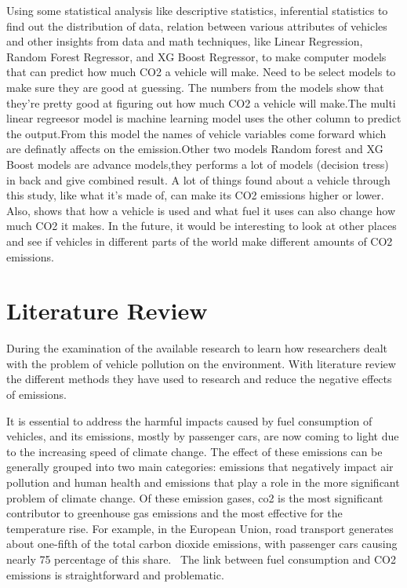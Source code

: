 \documentclass[12pt, a4paper,oneside]{book}
\numberwithin{equation}{section}
\begin{document}
Using some statistical analysis like descriptive statistics, inferential statistics to find out the distribution of data, relation between various attributes of vehicles and other insights from data and math techniques, like Linear Regression, Random Forest Regressor, and XG Boost Regressor, to make computer models that can predict how much CO2 a vehicle will make. Need to be select models to make sure they are good at guessing. The numbers from the models show that they're pretty good at figuring out how much CO2 a vehicle will make.The multi linear regreesor model is machine learning model uses the other column to predict the output.From this model the names of vehicle variables come forward which are definatly affects on  the emission.Other two models Random forest and XG Boost models are advance models,they performs a lot of models (decision tress) in back and give combined result. A lot of things found  about a vehicle through this study, like what it's made of, can make its CO2 emissions higher or lower. Also, shows that how a vehicle is used and what fuel it uses can also change how much CO2 it makes. In the future, it would be interesting to look at other places and see if vehicles in different parts of the world make different amounts of CO2 emissions.






\chapter{Literature Review}\label{ch:3}

During the examination of the available research to learn how researchers dealt with the problem of vehicle pollution on the environment. With literature review the different methods they have used to research and reduce the negative effects of emissions.


It is essential to address the harmful impacts caused by fuel consumption of vehicles, and its emissions, mostly by passenger cars, are now coming to light due to the increasing speed of climate change. The effect of these emissions can be generally grouped into two main categories: emissions that negatively impact air pollution and human health and emissions that play a role in the more significant problem of climate change. Of these emission gases, co2 is the most significant contributor to greenhouse gas emissions and the most effective for the temperature rise. For example, in the European Union, road transport generates about one-fifth of the total carbon dioxide emissions, with passenger cars causing nearly 75 percentage of this share.~\cite{ref3} The link between fuel consumption and CO2 emissions is straightforward and problematic.~\cite{ref4}
\end{document}
